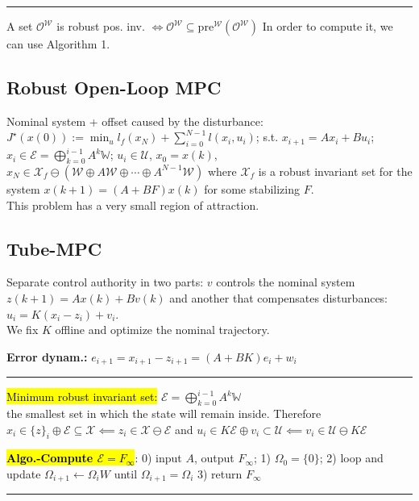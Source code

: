 \documentclass[10pt,a4paper,landscape]{article}
\newcommand{\quadRule}{\vspace{-3pt}\rule{0.23\textwidth}{0.4pt}}
\begin{document}
\begin{multicols*}{4}
\quadRule

A set $\mathcal{O}^\mathcal{W}$ is robust pos. inv. $\iff \mathcal{O}^\mathcal{W} \subseteq \mathrm{pre}^\mathcal{W}(\mathcal{O^\mathcal{W}})$
In order to compute it, we can use Algorithm 1.

\subsection{Robust Open-Loop MPC}
Nominal system + offset caused by the disturbance: $J^\star(x(0)) := \min_u l_f(x_N) + \sum_{i=0}^{N-1} l(x_i, u_i)$; 
s.t. $x_{i+1} = Ax_i + Bu_i$; $x_i \in \mathcal{E} = \bigoplus_{k=0}^{i-1} A^{k} \mathbb{W}$; 
$u_i \in \mathcal{U}$,  $x_0 = x(k)$, $x_N \in \mathcal{X}_f \ominus ( \mathcal{W} \oplus A\mathcal{W} \oplus \cdots \oplus A^{N-1}\mathcal{W} )$
where $\mathcal{X}_f$ is a robust invariant set for the system $x(k+1) = (A+BF)x(k)$ for some stabilizing $F$.\\
This problem has a very small region of attraction.
\vspace{-5pt}
\subsection{Tube-MPC}
Separate control authority in two parts:
$v$ controls the nominal system $z(k+1) = Ax(k) + Bv(k)$ and another that compensates disturbances: $u_i = K(x_i - z_i) + v_i$.\\
We fix $K$ offline and optimize the nominal trajectory.

\textbf{Error dynam.:} $e_{i+1} = x_{i+1}-z_{i+1} = (A + BK) e_i + w_i$

\quadRule

\hl{Minimum robust invariant set:} $\mathcal{E} =\bigoplus_{k=0}^{i-1} A^{k} \mathbb{W}$\\
the smallest set in which the state will remain inside.
Therefore $x_i \in \{z\}_i \oplus \mathcal{E} \subseteq \mathcal{X} \impliedby z_i \in \mathcal{X} \ominus \mathcal{E}$ and 
$u_i \in K\mathcal{E} \oplus v_i \subset \mathcal{U} \impliedby v_i \in \mathcal{U} \ominus K\mathcal{E}$

\hl{\textbf{Algo.-Compute $\mathcal{E} = F_{\infty}$}}: 0) input $A$, output $F_{\infty}$; 1) $\Omega_0 = \{0\}$; 2) loop and update $\Omega_{i+1} \leftarrow \Omega_{i} W $ until $\Omega_{i+1} = \Omega_{i}$ 3) return $F_{\infty}$

\quadRule


\end{multicols*}
\end{document}
